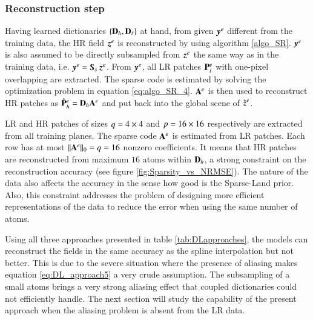 \subsubsection*{Reconstruction step}
Having learned dictionaries $ \{\mathbf{D}_h,\mathbf{D}_\ell \} $ at hand, from given $ \operatorname{\boldsymbol{y}}^{e} $ different from the training data, the HR field $ \operatorname{\boldsymbol{z}}^{e} $ is reconstructed by using algorithm \ref{algo_SR}. $ \operatorname{\boldsymbol{y}}^{e} $ is also assumed to be directly subsampled from $ \operatorname{\boldsymbol{z}}^{e} $ the same way as in the training data, i.e. $ \y^\ext = \Sub_s \z^\ext $. From $ \operatorname{\boldsymbol{y}}^{e} $, all LR patches $ \mathbf{P}_l^{e} $ with one-pixel overlapping are extracted. The sparse code is estimated by solving the optimization problem in equation \ref{eq:algo_SR_4}. $ \mathbf{A}^{e} $ is then used to reconstruct HR patches as $ \hat{\mathbf{P}}_h^{e} = \mathbf{D}_h \mathbf{A}^{e} $ and put back into the global scene of $ \hat{\operatorname{\boldsymbol{z}}}^{e} $. 

LR and HR patches of sizes $ q = 4 \times 4 $ and $ p = 16 \times 16$ respectively are extracted from all training planes. The sparse code $ \mathbf{A}^{e} $ is estimated from LR patches. Each row has at most $ \operatorname{\Arrowvert \mathit{\mathbf{A}^{e}} \Arrowvert_0 } = q = 16 $ nonzero coefficients. It means that HR patches are reconstructed from maximum $ 16 $ atoms within $ \mathbf{D}_h $, a strong constraint on the reconstruction accuracy (see figure \ref{fig:Sparsity_vs_NRMSE}). The nature of the data also affects the accuracy in the sense how good is the Sparse-Land prior. Also, this constraint addresses the problem of designing more efficient representations of the data to reduce the error when using the same number of atoms. 

Using all three approaches presented in table \ref{tab:DLapproaches}, the models can reconstruct the fields in the same accuracy as the spline interpolation but not better. This is due to the severe situation where the presence of aliasing makes equation \ref{eq:DL_approach5} a very crude assumption. The subsampling of a small atoms brings a very strong aliasing effect that coupled dictionaries could not efficiently handle. The next section will study the capability of the present approach when the aliasing problem is absent from the LR data.

